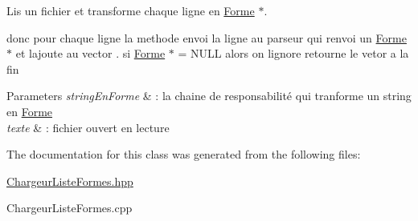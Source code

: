 Lis un fichier et transforme chaque ligne en \mbox{\hyperlink{class_forme}{Forme}} $\ast$. 

donc pour chaque ligne la methode envoi la ligne au parseur qui renvoi un \mbox{\hyperlink{class_forme}{Forme}} $\ast$ et l\textquotesingle{}ajoute au vector . si \mbox{\hyperlink{class_forme}{Forme}} $\ast$ = N\+U\+LL alors on l\textquotesingle{}ignore retourne le vetor a la fin


\begin{DoxyParams}{Parameters}
{\em string\+En\+Forme} & \+: la chaine de responsabilité qui tranforme un string en \mbox{\hyperlink{class_forme}{Forme}} \\
\hline
{\em texte} & \+: fichier ouvert en lecture \\
\hline
\end{DoxyParams}


The documentation for this class was generated from the following files\+:\begin{DoxyCompactItemize}
\item 
\mbox{\hyperlink{_chargeur_liste_formes_8hpp}{Chargeur\+Liste\+Formes.\+hpp}}\item 
Chargeur\+Liste\+Formes.\+cpp\end{DoxyCompactItemize}
